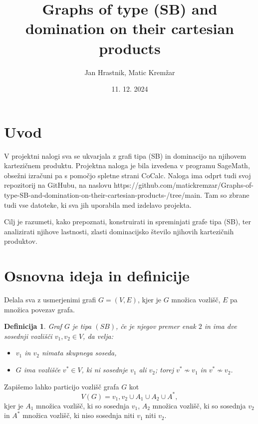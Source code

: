 \documentclass{article}
\begin{document}
\newtheorem{definition}{Definicija}


\title{Graphs of type (SB) and domination on their cartesian products}

\author{Jan Hrastnik, Matic Kremžar}
\date{11. 12. 2024}
\maketitle


\section{Uvod}
V projektni nalogi sva se ukvarjala z grafi tipa (SB) in dominacijo na njihovem kartezičnem produktu. 
Projektna naloga je bila izvedena v programu SageMath, obsežni izračuni pa s pomočjo spletne strani CoCalc.
Naloga ima odprt tudi svoj repozitorij na GitHubu, na naslovu https://github.com/matickremzar/Graphs-of-type-SB-and-domination-on-their-cartesian-products-/tree/main.
Tam so zbrane tudi vse datoteke, ki sva jih uporabila med izdelavo projekta.

Cilj je razumeti, kako prepoznati, konstruirati in spreminjati grafe tipa (SB), 
ter analizirati njihove lastnosti, zlasti dominacijsko število njihovih kartezičnih produktov.

\section{Osnovna ideja in definicije}
Delala sva z usmerjenimi grafi $G = (V,E)$, kjer je $G$ množica vozlišč, $E$ 
pa množica povezav grafa.

\begin{definition}
    Graf $G$ je tipa $(SB)$, če je njegov premer enak $2$ in ima dve sosednji vozlišči $v_1, v_2\in V$, da velja:
    \begin{itemize}
        \item $v_1$ in $v_2$ nimata skupnega soseda,
        \item $G$ ima vozlišče $v^*\in V$, ki ni sosednje $v_1$ ali $v_2$; torej $v^*\not\sim v_1$ in $v^*\not\sim v_2$. \newline
    \end{itemize}
\end{definition} 

Zapišemo lahko particijo vozlišč grafa $G$ kot $$V(G) = {v_1, v_2} \cup A_1 \cup A_2 \cup A^*,$$
kjer je $A_1$ množica vozlišč, ki so sosednja $v_1$, $A_2$ množica vozlišč, ki so sosednja $v_2$ in 
$A^*$ množica vozlišč, ki niso sosednja niti $v_1$ niti $v_2$.
\end{document}
